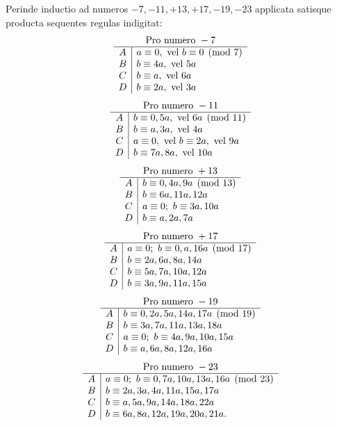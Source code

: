 \documentclass[12pt]{article}
\begin{document}
Perinde inductio ad numeros $-7,-11,+13,+17,-19,-23$ applicata satisque producta sequentes regulas indigitat:
\[
\begin{array}{c|l}
\multicolumn{2}{c}{\text{Pro numero }-7}\\\hline
A& a\equiv0,\ \text{vel }b\equiv0\pmod7\\
B& b\equiv4a,\ \text{vel }5a\\
C& b\equiv a,\ \text{vel }6a\\
D& b\equiv2a,\ \text{vel }3a
\end{array}
\]
\[
\begin{array}{c|l}
\multicolumn{2}{c}{\text{Pro numero }-11}\\\hline
A& b\equiv0,5a,\ \text{vel }6a\pmod{11}\\
B& b\equiv a,3a,\ \text{vel }4a\\
C& a\equiv0,\ \text{vel }b\equiv2a,\ \text{vel }9a\\
D& b\equiv7a,8a,\ \text{vel }10a
\end{array}
\]
\[
\begin{array}{c|l}
\multicolumn{2}{c}{\text{Pro numero }+13}\\\hline
A& b\equiv0,4a,9a\pmod{13}\\
B& b\equiv6a,11a,12a\\
C& a\equiv0;\ b\equiv3a,10a\\
D& b\equiv a,2a,7a
\end{array}
\]
\[
\begin{array}{c|l}
\multicolumn{2}{c}{\text{Pro numero }+17}\\\hline
A& a\equiv0;\ b\equiv0,a,16a\pmod{17}\\
B& b\equiv2a,6a,8a,14a\\
C& b\equiv5a,7a,10a,12a\\
D& b\equiv3a,9a,11a,15a
\end{array}
\]
\[
\begin{array}{c|l}
\multicolumn{2}{c}{\text{Pro numero }-19}\\\hline
A& b\equiv0,2a,5a,14a,17a\pmod{19}\\
B& b\equiv3a,7a,11a,13a,18a\\
C& a\equiv0;\ b\equiv4a,9a,10a,15a\\
D& b\equiv a,6a,8a,12a,16a
\end{array}
\]
\[
\begin{array}{c|l}
\multicolumn{2}{c}{\text{Pro numero }-23}\\\hline
A& a\equiv0;\ b\equiv0,7a,10a,13a,16a\pmod{23}\\
B& b\equiv2a,3a,4a,11a,15a,17a\\
C& b\equiv a,5a,9a,14a,18a,22a\\
D& b\equiv6a,8a,12a,19a,20a,21a.
\end{array}
\]
\end{document}
